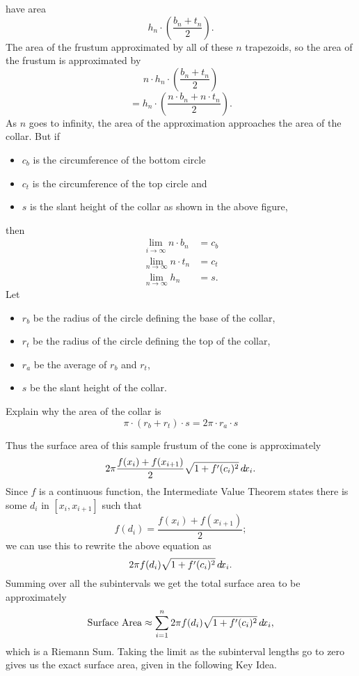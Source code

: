\documentclass{ximera}
\begin{document}
\begin{theorem}
\begin{explanation}
\begin{image}
    \end{image}
    have area
    \[
    h_{n}\cdot \left(  \frac{b_{n}+t_{n}}{2}\right).
    \]
    The area of the frustum approximated by all of these $n$
    trapezoids, so the area of the frustum is approximated by
    \[
    n\cdot h_n\cdot\left(\frac{b_{n}+t_{n}}{2}\right)
    \]
    \[
    =h_n\cdot \left(\frac{n\cdot b_{n}+n\cdot t_{n}}{2}\right).
    \]
    As $n$ goes to infinity, the area of the approximation approaches the area of
    the collar. But if 
    \begin{itemize}
    \item $c_{b}$ is the circumference of the bottom circle
    \item $c_{t}$ is the circumference of the top circle and 
    \item $s$ is the slant height of the collar as shown in the above
      figure,
    \end{itemize}
    then
    \begin{align*}
      \lim_{i\to \infty} n\cdot b_{n}  &  =c_{b}\\
      \lim_{n\to \infty} n \cdot t_{n}  &  =c_{t}\\
      \lim_{n\to \infty} h_{n}  &  =s.
    \end{align*}
    Let
    \begin{itemize}
    \item $r_b$ be the radius of the circle defining the base of the collar,
    \item $r_t$ be the radius of the circle defining the top of the collar,
    \item $r_a$ be the average of $r_b$ and $r_t$,
    \item $s$ be the slant height of the collar.
    \end{itemize}
    Explain why the area of the collar is
    \[
    \pi \cdot \left( r_{b}+r_{t}\right)\cdot s =2\pi\cdot r_{a}\cdot s
    \]
  \end{explanation}
\end{theorem}




Thus the surface area of this sample frustum of the cone is
approximately
\[
2\pi\frac{f(x_i)+f(x_{i+1})}2\sqrt{1+f'(c_i)^2}\mathop{}\!d\! x_i.
\]
Since $f$ is a continuous function, the Intermediate Value Theorem
states there is some $d_i$ in $[x_i,x_{i+1}]$ such that
\[
f(d_i) = \frac{f(x_i)+f(x_{i+1})}{2};
\]
we can use this to rewrite the above equation as
\[
2\pi f(d_i)\sqrt{1+f'(c_i)^2}\mathop{}\!d\! x_i.
\]
Summing over all the subintervals we get the total surface area to be
approximately
\[
\text{Surface Area}\approx \sum_{i=1}^n 2\pi f(d_i)\sqrt{1+f'(c_i)^2}\mathop{}\!d\! x_i,
\]
which is a Riemann Sum. Taking the limit as the subinterval lengths go
to zero gives us the exact surface area, given in the following Key
Idea.
\end{document}

